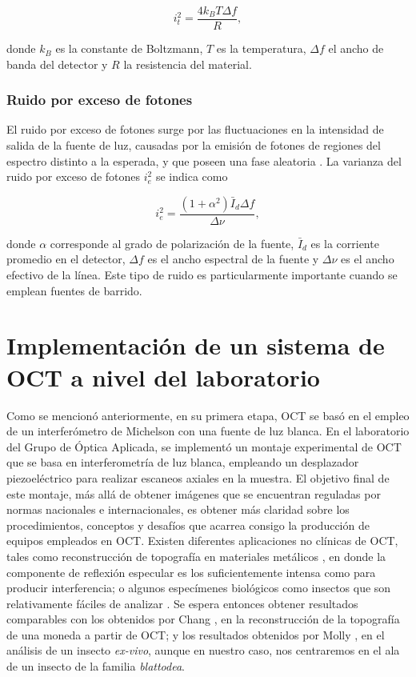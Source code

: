 \begin{equation}
	i_t^2 = \frac{4k_B T \Delta f}{R},
\end{equation}

\noindent donde $k_B$ es la constante de Boltzmann, $T$ es la temperatura, $\Delta f$ el ancho de banda del detector y $R$ la resistencia del material.

\subsubsection{Ruido por exceso de fotones}

El ruido por exceso de fotones surge por las fluctuaciones en la intensidad de salida de la fuente de luz, causadas por la emisión de fotones de regiones del espectro distinto a la esperada, y que poseen una fase aleatoria \cite{Rollins1999_2}. La varianza del ruido por exceso de fotones $i^2_{e}$ se indica como

\begin{equation}
i^2_{e} = \frac{(1+\alpha^2)\bar{I}_d\Delta f}{\Delta \nu},
\end{equation}

\noindent donde $\alpha$ corresponde al grado de polarización de la fuente, $\bar{I}_d$ es la corriente promedio en el detector, $\Delta f$ es el ancho espectral de la fuente y $\Delta \nu$ es el ancho efectivo de la línea. Este tipo de ruido es particularmente importante cuando se emplean fuentes de barrido.

\section{Implementación de un sistema de OCT a nivel del laboratorio}
\label{sec:impementacion}

Como se mencionó anteriormente, en su primera etapa, OCT se basó en el empleo de un interferómetro de Michelson con una fuente de luz blanca. En el laboratorio del Grupo de Óptica Aplicada, se implementó un montaje experimental de OCT que se basa en interferometría de luz blanca, empleando un desplazador piezoeléctrico para realizar escaneos axiales en la muestra. El objetivo final de este montaje, más allá de obtener imágenes \invivo que se encuentran reguladas por normas nacionales e internacionales, es obtener más claridad sobre los procedimientos, conceptos y desafíos que acarrea consigo la producción de equipos empleados en OCT. Existen diferentes aplicaciones no clínicas de OCT, tales como reconstrucción de topografía en materiales metálicos \cite{Chang2008}, en donde la componente de reflexión especular es los suficientemente intensa como para producir interferencia; o algunos especímenes biológicos \exvivo como insectos que son relativamente fáciles de analizar \cite{Molly2012}. Se espera entonces obtener resultados comparables con los obtenidos por Chang \etal \cite{Chang2008}, en la reconstrucción de la topografía de una moneda a partir de OCT; y los resultados obtenidos por Molly \etal \cite{Molly2012}, en el análisis de un insecto \textit{ex-vivo}, aunque en nuestro caso, nos centraremos en el ala de un insecto de la familia \emph{blattodea}.



